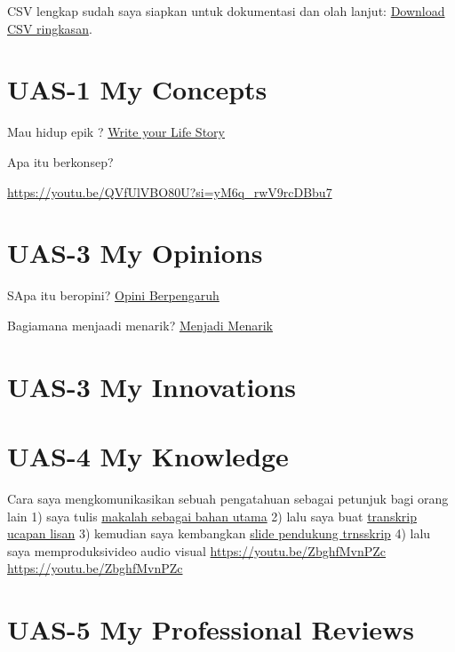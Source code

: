 \documentclass[
  letterpaper,
  DIV=11,
  numbers=noendperiod]{scrreprt}
\begin{document}
CSV lengkap sudah saya siapkan untuk dokumentasi dan olah lanjut:
\href{ringkasan_skor_UTS.csv}{Download CSV ringkasan}.


\chapter{UAS-1 My Concepts}\label{uas-1-my-concepts}

Mau hidup epik ? \href{lifestory.pdf}{Write your Life Story}

Apa itu berkonsep?

\url{https://youtu.be/QVfUlVBO80U?si=yM6q_rwV9rcDBbu7}


\chapter{UAS-3 My Opinions}\label{uas-3-my-opinions}

SApa itu beropini? \href{BM\%20Opini.mp4}{Opini Berpengaruh}

Bagiamana menjaadi menarik? \href{./Interesting.mp4}{Menjadi Menarik}


\chapter{UAS-3 My Innovations}\label{uas-3-my-innovations}


\chapter{UAS-4 My Knowledge}\label{uas-4-my-knowledge}

Cara saya mengkomunikasikan sebuah pengatahuan sebagai petunjuk bagi
orang lain 1) saya tulis
\href{Rekomendasi\%20Presentasi\%20Efektif(Contoh\%20Makalah).pdf}{makalah
sebagai bahan utama} 2) lalu saya buat
\href{Contoh\%20Transkrip\%20Presentasi.pdf}{transkrip ucapan lisan} 3)
kemudian saya kembangkan
\href{Rekomendasi\%20Presentasi\%20(Contoh\%20Slides).pdf}{slide
pendukung trnsskrip} 4) lalu saya memproduksivideo audio visual
\url{https://youtu.be/ZbghfMvnPZc} \url{https://youtu.be/ZbghfMvnPZc}


\chapter{UAS-5 My Professional
Reviews}\label{uas-5-my-professional-reviews}
\end{document}
